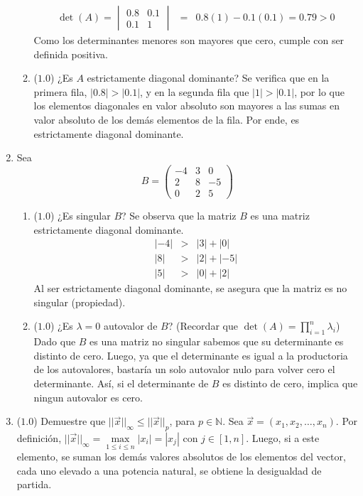 \documentclass[12pt]{article}
\newcommand{\N}{\ensuremath{\mathbb{N}}}
\begin{document}
\begin{enumerate}[leftmargin=*,widest=9]
\begin{enumerate}[label=\alph*]
\begin{eqnarray*}
   \det(A) = \begin{vmatrix}
    0.8 & 0.1\\ 0.1 & 1
    \end{vmatrix} & = & 0.8(1) -0.1(0.1) = 0.79 > 0
   \end{eqnarray*}
   Como los determinantes menores son mayores que cero, cumple con ser definida positiva.
    \item (\(1.0\)) ¿Es \(A\) estrictamente diagonal dominante?
Se verifica que en la primera fila, \(|0.8| > |0.1|\), y en la segunda fila que \(|1| > |0.1|\), por lo que los elementos diagonales en valor absoluto son mayores a las sumas en valor absoluto de los demás elementos de la fila. Por ende, es estrictamente diagonal dominante.
    \end{enumerate}
    \item Sea
    \[
    B = \begin{pmatrix}
    -4 & 3 & 0\\ 2 & 8 & -5\\ 0 & 2 & 5
    \end{pmatrix}
    \]
    \begin{enumerate}[label=\alph*]
    \item (\(1.0\)) ¿Es singular \(B\)?
    Se observa que la matriz \(B\) es una matriz estrictamente diagonal dominante.
    \begin{eqnarray*}
    |-4| & > & |3|+|0|\\
    |8| & > & |2|+|-5|\\
    |5| & > & |0|+|2|
    \end{eqnarray*}
    Al ser estrictamente diagonal dominante, se asegura que la matriz es no singular (propiedad).
    \item (\(1.0\)) ¿Es \(\lambda = 0\) autovalor de \(B\)? (Recordar que \(\det(A) = \prod\limits_{i=1}^n \lambda_i\))
    Dado que \(B\) es una matriz no singular sabemos que su determinante es distinto de cero. Luego, ya que el determinante es igual a la productoria de los autovalores, bastaría un solo autovalor nulo para volver cero el determinante. Así, si el determinante de \(B\) es distinto de cero, implica que ningun autovalor es cero.
    \end{enumerate}
  \item (\(1.0\)) Demuestre que \( ||\vec{x}||_{\infty} \leq ||\vec{x}||_p\), para \(p \in \N\).
  Sea \(\vec{x} = (x_1, x_2, \ldots, x_n)\).
  Por definición, \( ||\vec{x}||_\infty = \max\limits_{1\leq i\leq n} |x_i|=|x_j|\) con \(j \in [1, n]\).
  Luego, si a este elemento, se suman los demás valores absolutos de los elementos del vector, cada uno elevado a una potencia natural, se obtiene la desigualdad de partida.

\end{enumerate}
\end{document}
